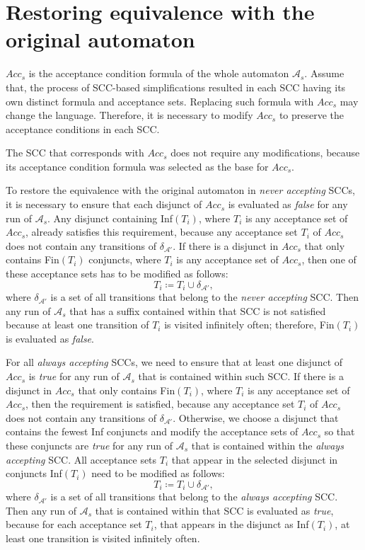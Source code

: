\documentclass[
  digital, %
  twoside, %
  table,   %
  lof,     %
  lot,     %
]{fithesis3}
\begin{document}
\section{Restoring equivalence with the original automaton}
\label{sec:restore_equiv}
$Acc_s$ is the acceptance condition formula of the whole automaton $\mathcal{A}_s$. Assume that, the process of SCC-based simplifications resulted in each SCC  having its own distinct formula and acceptance sets. Replacing such formula with $Acc_s$ may change the language. Therefore, it is necessary to modify $Acc_s$ to preserve the acceptance conditions in each SCC. 

The SCC that corresponds with $Acc_s$ does not require any modifications, because its acceptance condition formula was selected as the base for $Acc_s$.

To restore the equivalence with the original automaton in \emph{never accepting} SCCs, it is necessary to ensure that each disjunct of $Acc_s$ is evaluated as \emph{false} for any run of $\mathcal{A}_s$. Any disjunct containing Inf$(T_i)$, where $T_i$ is any acceptance set of $Acc_s$, already satisfies this requirement, because any acceptance set $T_i$ of $Acc_s$ does not contain any transitions of $\delta_{\mathcal{A'}}$. If there is a disjunct in $Acc_s$ that only contains Fin$(T_i)$ conjuncts, where $T_i$ is any acceptance set of $Acc_s$, then one of these acceptance sets has to be modified as follows:
\begin{equation*}
  T_i \coloneqq T_i \cup \delta_{\mathcal{A'}},
\end{equation*}
where $\delta_{\mathcal{A'}}$ is a set of all transitions that belong to the \emph{never accepting} SCC. Then any run of $\mathcal{A}_s$ that has a suffix contained within that SCC is not satisfied because at least one transition of $T_i$ is visited infinitely often; therefore, Fin$(T_i)$ is evaluated as \emph{false}.

For all \emph{always accepting} SCCs, we need to ensure that at least one disjunct of $Acc_s$ is \emph{true} for any run of $\mathcal{A}_s$ that is contained within such SCC. If there is a disjunct in $Acc_s$ that only contains Fin$(T_i)$, where $T_i$ is any acceptance set of $Acc_s$, then the requirement is satisfied, because any acceptance set $T_i$ of $Acc_s$ does not contain any transitions of $\delta_{\mathcal{A'}}$. Otherwise, we choose a disjunct that contains the fewest Inf conjuncts and modify the acceptance sets of $Acc_s$ so that these conjuncts are \emph{true} for any run of $\mathcal{A}_s$ that is contained within the \emph{always accepting} SCC. All acceptance sets $T_i$ that appear in the selected disjunct in conjuncts Inf$(T_i)$ need to be modified as follows:
\begin{equation*}
  T_i \coloneqq T_i \cup \delta_{\mathcal{A'}},
\end{equation*}
where $\delta_{\mathcal{A'}}$ is a set of all transitions that belong to the \emph{always accepting} SCC. Then any run of $\mathcal{A}_s$ that is contained within that SCC is evaluated as \emph{true}, because for each acceptance set $T_i$, that appears in the disjunct as Inf$(T_i)$, at least one transition is visited infinitely often.
\end{document}

